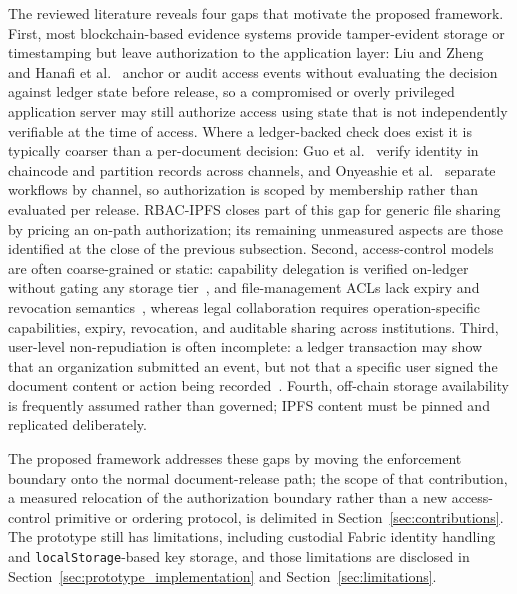 \documentclass[preprint,12pt]{elsarticle}
\begin{document}
The reviewed literature reveals four gaps that motivate the proposed
framework. First, most blockchain-based evidence systems provide
tamper-evident storage or timestamping but leave authorization to the
application layer: Liu and Zheng~\cite{liu2024blockchain} and Hanafi et
al.~\cite{hanafi2021ipfschain}
anchor or audit access events without evaluating the decision against
ledger state before release, so a compromised or overly privileged
application server may still authorize access using state that is not
independently verifiable at the time of access. Where a ledger-backed
check does exist it is typically coarser than a per-document decision:
Guo et al.~\cite{guo2024efficient} verify identity in chaincode and
partition records across channels, and Onyeashie et
al.~\cite{onyeashie2025fabricEvidence} separate workflows by channel, so
authorization is scoped by membership rather than evaluated per release.
RBAC-IPFS
\cite{liu2026rbacipfs} closes part of this gap for generic file sharing
by pricing an on-path authorization; its remaining unmeasured aspects
are those identified at the close of the previous subsection. Second, access-control models are often
coarse-grained or static: capability delegation is verified on-ledger
without gating any storage tier~\cite{mukta2026zerotrust}, and
file-management ACLs lack expiry and revocation
semantics~\cite{chen2022filewallet}, whereas legal collaboration
requires operation-specific capabilities, expiry, revocation, and
auditable sharing across institutions. Third, user-level
non-repudiation is often incomplete: a ledger transaction may show
that an organization submitted an event, but not that a specific user
signed the document content or action being
recorded~\cite{peelam2026decentralized}. Fourth, off-chain storage
availability is frequently assumed rather than governed; IPFS content
must be pinned and replicated deliberately.

The proposed framework addresses these gaps by moving the enforcement
boundary onto the normal document-release path; the scope of that
contribution, a measured relocation of the authorization boundary
rather than a new access-control primitive or ordering protocol, is
delimited in Section~\ref{sec:contributions}. The prototype still has limitations, including custodial Fabric
identity handling and \texttt{localStorage}-based key storage, and
those limitations are disclosed in
Section~\ref{sec:prototype_implementation} and
Section~\ref{sec:limitations}.
\end{document}
